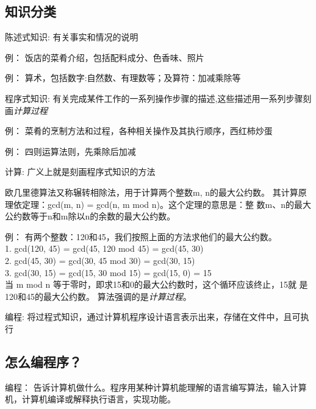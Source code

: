 \subsection{知识分类}
\begin{description}
\item{陈述式知识:} 有关事实和情况的说明
  \begin{compactenum}
  \item 例： 饭店的菜肴介绍，包括配料成分、色香味、照片
  \item 例： 算术，包括数字:自然数、有理数等；及算符：加减乘除等
  \end{compactenum}
\item{程序式知识:} 有关完成某件工作的一系列操作步骤的描述,这些描述用一系列步骤刻画\emph{计算过程}
  \begin{compactenum}
  \item 例： 菜肴的烹制方法和过程，各种相关操作及其执行顺序，西红柿炒蛋
  \item 例： 四则运算法则，先乘除后加减
  \end{compactenum}
\item {计算:} 广义上就是刻画程序式知识的方法
  \begin{compactenum}
  \item 欧几里德算法又称辗转相除法，用于计算两个整数m, n的最大公约数。
    其计算原理依定理：gcd(m, n) = gcd(n, m mod n)。这个定理的意思是：整
    数m、n的最大公约数等于n和m除以n的余数的最大公约数。
  \item 例： 有两个整数：120和45，我们按照上面的方法求他们的最大公约数。 \\
    1. gcd(120, 45) = gcd(45, 120 mod 45) = gcd(45, 30) \\
    2. gcd(45, 30) = gcd(30, 45 mod 30) = gcd(30, 15) \\
    3. gcd(30, 15) = gcd(15, 30 mod 15) = gcd(15, 0) = 15 \\
    当 m mod n 等于零时，即求15和0的最大公约数时，这个循环应该终止，15就
    是120和45的最大公约数。
    算法强调的是\emph{计算过程}。
  \end{compactenum}
\item {编程:} 将过程式知识，通过计算机程序设计语言表示出来，存储在文件中，且可执行
\end{description}

\subsection{怎么编程序？}
编程： 告诉计算机做什么。程序用某种计算机能理解的语言编写算法，输入计算
机，计算机编译或解释执行语言，实现功能。

